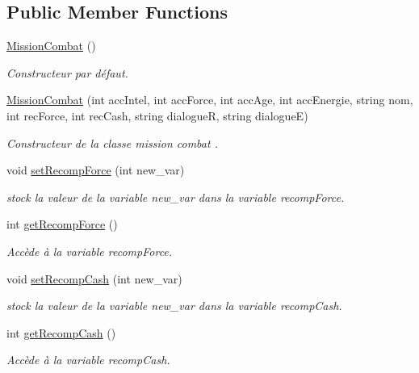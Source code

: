 \subsection*{Public Member Functions}
\begin{DoxyCompactItemize}
\item 
\hyperlink{class_mission_combat_a16d2c93a4366d48fb6ea6339388c76c4}{Mission\-Combat} ()
\begin{DoxyCompactList}\small\item\em Constructeur par défaut. \end{DoxyCompactList}\item 
\hyperlink{class_mission_combat_a7599e8cb49f2e49b8a54cfbf836c2f42}{Mission\-Combat} (int acc\-Intel, int acc\-Force, int acc\-Age, int acc\-Energie, string nom, int rec\-Force, int rec\-Cash, string dialogue\-R, string dialogue\-E)
\begin{DoxyCompactList}\small\item\em Constructeur de la classe mission combat . \end{DoxyCompactList}\item 
void \hyperlink{class_mission_combat_ad838e9ec99671e81fe9b0edb18b81f02}{set\-Recomp\-Force} (int new\-\_\-var)
\begin{DoxyCompactList}\small\item\em stock la valeur de la variable new\-\_\-var dans la variable recomp\-Force. \end{DoxyCompactList}\item 
int \hyperlink{class_mission_combat_a47460faf8b07a407771f11249fbe26d1}{get\-Recomp\-Force} ()
\begin{DoxyCompactList}\small\item\em Accède à la variable recomp\-Force. \end{DoxyCompactList}\item 
void \hyperlink{class_mission_combat_a8d9d56b01541e6ec190a029ddb9861e3}{set\-Recomp\-Cash} (int new\-\_\-var)
\begin{DoxyCompactList}\small\item\em stock la valeur de la variable new\-\_\-var dans la variable recomp\-Cash. \end{DoxyCompactList}\item 
int \hyperlink{class_mission_combat_ac8acd44a461561bd13f718c099bdd416}{get\-Recomp\-Cash} ()
\begin{DoxyCompactList}\small\item\em Accède à la variable recomp\-Cash. \end{DoxyCompactList}\item 

\end{DoxyCompactItemize}

